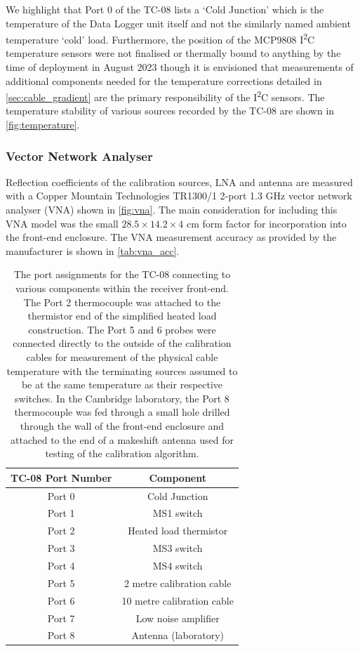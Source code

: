 We highlight that Port 0 of the TC-08 lists a ‘Cold Junction’ which is the temperature of the Data Logger unit itself and not the similarly named ambient temperature ‘cold’ load. Furthermore, the position of the MCP9808 I\textsuperscript{2}C temperature sensors were not finalised or thermally bound to anything by the time of deployment in August 2023 though it is envisioned that measurements of additional components needed for the temperature corrections detailed in \cref{sec:cable_gradient} are the primary responsibility of the I\textsuperscript{2}C sensors. The temperature stability of various sources recorded by the TC-08 are shown in \cref{fig:temperature}.


\subsubsection{Vector Network Analyser}
Reflection coefficients of the calibration sources, LNA and antenna are measured with a Copper Mountain Technologies TR1300/1 2-port 1.3 GHz vector network analyser (VNA) shown in \cref{fig:vna}. The main consideration for including this VNA model was the small $28.5 \times 14.2 \times 4$ cm form factor for incorporation into the front-end enclosure. The VNA measurement accuracy as provided by the manufacturer is shown in \cref{tab:vna_acc}.
\begin{table}[p]
    \vspace{-.4cm}
    \begin{center}
    \begin{tabular}{ |c|c| }
    \hline
    TC-08 Port Number & Component \\
    \hline
    Port 0 & Cold Junction \\
    Port 1 & MS1 switch \\
    Port 2 & Heated load thermistor \\
    Port 3 & MS3 switch\\
    Port 4 & MS4 switch \\
    Port 5 & 2 metre calibration cable \\
    Port 6 & 10 metre calibration cable \\
    Port 7 & Low noise amplifier \\
    Port 8 & Antenna (laboratory) \\
    \hline
    \end{tabular}
    \caption{The port assignments for the TC-08 connecting to various components within the receiver front-end. The Port 2 thermocouple was attached to the thermistor end of the simplified heated load construction. The Port 5 and 6 probes were connected directly to the outside of the calibration cables for measurement of the physical cable temperature with the terminating sources assumed to be at the same temperature as their respective switches. In the Cambridge laboratory, the Port 8 thermocouple was fed through a small hole drilled through the wall of the front-end enclosure and attached to the end of a makeshift antenna used for testing of the calibration algorithm.}
    \label{tab:tc08}
    \end{center}
\end{table}

